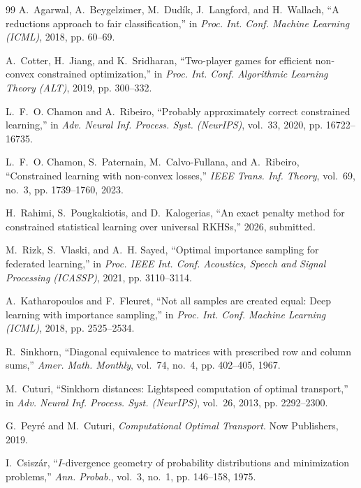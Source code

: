 \documentclass{article}
\theoremstyle{definition}
\begin{document}
\begin{thebibliography}{99}
A.~Agarwal, A.~Beygelzimer, M.~Dud\'{i}k, J.~Langford, and H.~Wallach, ``A
reductions approach to fair classification,'' in \emph{Proc. Int. Conf. Machine
Learning (ICML)}, 2018, pp. 60--69.

A.~Cotter, H.~Jiang, and K.~Sridharan, ``Two-player games for efficient
non-convex constrained optimization,'' in \emph{Proc. Int. Conf. Algorithmic
Learning Theory (ALT)}, 2019, pp. 300--332.

L.~F.~O. Chamon and A.~Ribeiro, ``Probably approximately correct constrained
learning,'' in \emph{Adv. Neural Inf. Process. Syst. (NeurIPS)}, vol.~33, 2020,
pp. 16722--16735.

L.~F.~O. Chamon, S.~Paternain, M.~Calvo-Fullana, and A.~Ribeiro, ``Constrained
learning with non-convex losses,'' \emph{IEEE Trans. Inf. Theory}, vol.~69,
no.~3, pp. 1739--1760, 2023.

H.~Rahimi, S.~Pougkakiotis, and D.~Kalogerias, ``An exact penalty method for
constrained statistical learning over universal RKHSs,'' 2026, submitted.

M.~Rizk, S.~Vlaski, and A.~H. Sayed, ``Optimal importance sampling for
federated learning,'' in \emph{Proc. IEEE Int. Conf. Acoustics, Speech and
Signal Processing (ICASSP)}, 2021, pp. 3110--3114.

A.~Katharopoulos and F.~Fleuret, ``Not all samples are created equal: Deep
learning with importance sampling,'' in \emph{Proc. Int. Conf. Machine
Learning (ICML)}, 2018, pp. 2525--2534.

R.~Sinkhorn, ``Diagonal equivalence to matrices with prescribed row and column
sums,'' \emph{Amer. Math. Monthly}, vol.~74, no.~4, pp. 402--405, 1967.

M.~Cuturi, ``Sinkhorn distances: Lightspeed computation of optimal transport,''
in \emph{Adv. Neural Inf. Process. Syst. (NeurIPS)}, vol.~26, 2013, pp.
2292--2300.

G.~Peyr\'{e} and M.~Cuturi, \emph{Computational Optimal Transport}. Now
Publishers, 2019.

I.~Csisz\'{a}r, ``$I$-divergence geometry of probability distributions and
minimization problems,'' \emph{Ann. Probab.}, vol.~3, no.~1, pp. 146--158, 1975.


\end{thebibliography}
\end{document}
